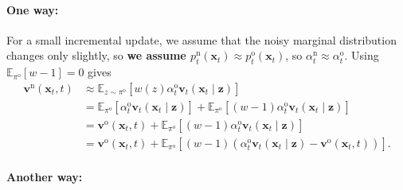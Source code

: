 \documentclass{article} %
\begin{document}
\paragraph{One way:}
For a small incremental update, we assume that the noisy marginal distribution changes only slightly, so \textbf{we assume
$p_t^{\mathrm{n}}(\mathbf x_t)\approx p_t^{\mathrm{o}}(\mathbf x_t)$}, so
$\alpha_t^{\mathrm{n}}\approx\alpha_t^{\mathrm{o}}$. Using
$\mathbb E_{\pi^{\mathrm{o}}}[w-1]=0$ gives
\begin{align}
\mathbf v^{\mathrm{n}}(\mathbf x_t,t)
&\approx\mathbb E_{z\sim\pi^{\mathrm{o}}}[w(z)\alpha_t^{\mathrm{o}}\mathbf v_t(\mathbf x_t\mid\mathbf z)]
\nonumber\\
&=\mathbb E_{\pi^{\mathrm{o}}}
   [\alpha_t^{\mathrm{o}}\mathbf v_t(\mathbf x_t\mid\mathbf z)]
 +\mathbb E_{\pi^{\mathrm{o}}}[(w-1)\alpha_t^{\mathrm{o}}\mathbf v_t(\mathbf x_t\mid\mathbf z)]\\
&=\mathbf v^{\mathrm{o}}(\mathbf x_t,t)
 +\mathbb E_{\pi^{\mathrm{o}}}[(w-1)\alpha_t^{\mathrm{o}}\mathbf v_t(\mathbf x_t\mid\mathbf z)]
\nonumber\\
&=\mathbf v^{\mathrm{o}}(\mathbf x_t,t)
 +\mathbb E_{\pi^{\mathrm{o}}}
   [(w-1)(\alpha_t^{\mathrm{o}}\mathbf v_t(\mathbf x_t\mid\mathbf z)-\mathbf v^{\mathrm{o}}(\mathbf x_t,t))].
\label{eq:increment}
\end{align}

\paragraph{Another way:}
\end{document}
